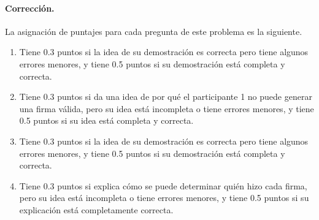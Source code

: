 \paragraph{Corrección.} La asignación de puntajes para cada pregunta de este problema es la siguiente.
\begin{enumerate}
      \item Tiene 0.3 puntos si la idea de su demostración es correcta pero tiene algunos
      errores menores, y tiene 0.5 puntos si su demostración está completa y correcta.

	  \item Tiene 0.3 puntos si da una idea de por qué el participante 1 no puede generar
	  una firma válida, pero su idea está incompleta o tiene errores menores, y tiene 0.5 puntos
	  si su idea está completa y correcta.

	  \item Tiene 0.3 puntos si la idea de su demostración es correcta pero tiene algunos
      errores menores, y tiene 0.5 puntos si su demostración está completa y correcta.

		\item Tiene 0.3 puntos si explica cómo se puede determinar quién hizo cada firma,
		pero su idea está incompleta o tiene errores menores, y tiene 0.5 puntos si su
		explicación está completamente correcta.
\end{enumerate}
